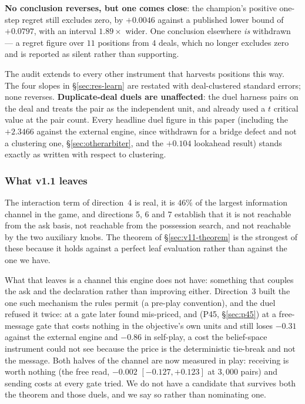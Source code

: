 \documentclass[11pt,letterpaper]{article}
\begin{document}
\textbf{No conclusion reverses, but one comes close}: the champion's positive
one-step regret still excludes zero, by $+0.0046$ against a published lower
bound of $+0.0797$, with an interval $1.89\times$ wider. One conclusion
elsewhere \emph{is} withdrawn --- a regret figure over $11$ positions from $4$
deals, which no longer excludes zero and is reported as silent rather than
supporting.

The audit extends to every other instrument that harvests positions this way.
The four slopes in \S\ref{sec:res-learn} are restated with deal-clustered
standard errors; none reverses. \textbf{Duplicate-deal duels are unaffected}:
the duel harness pairs on the deal and treats the pair as the independent unit,
and already used a $t$ critical value at the pair count. Every headline duel
figure in this paper (including the $+2.3466$ against the external engine, since withdrawn
for a bridge defect and not a clustering one, \S\ref{sec:otherarbiter}, and
the $+0.104$ lookahead result) stands exactly as written with respect to
clustering.

\subsubsection{What v1.1 leaves}

The interaction term of direction~4 is real, it is $46\%$ of the largest
information channel in the game, and directions 5, 6 and 7 establish that it is
not reachable from the ask basis, not reachable from the possession search, and
not reachable by the two auxiliary knobs. The theorem of \S\ref{sec:v11-theorem}
is the strongest of these because it holds against a perfect leaf evaluation
rather than against the one we have.

What that leaves is a channel this engine does not have: something that couples
the ask and the declaration rather than improving either. Direction~3 built the
one such mechanism the rules permit (a pre-play convention), and the duel
refused it twice: at a gate later found mis-priced, and (P45,
\S\ref{sec:p45}) at a free-message gate that costs nothing in the objective's
own units and still loses $-0.31$ against the external engine and $-0.86$ in self-play, a
cost the belief-space instrument could not see because the price is the
deterministic tie-break and not the message. Both halves of the channel are
now measured in play: receiving is worth nothing (the free read, $-0.002$
$[-0.127, +0.123]$ at $3{,}000$ pairs) and sending costs at every gate tried.
We do not have a candidate that survives both the theorem and those duels,
and we say so rather than nominating one.
\end{document}
